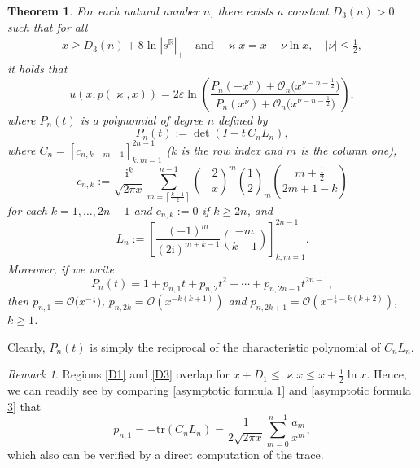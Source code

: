 \documentclass[a4paper,10pt,leqno]{amsart}
\numberwithin{equation}{subsection}
\theoremstyle{plain}
\newtheorem{thm}{Theorem}[section]
\theoremstyle{definition}
\theoremstyle{remark}
\newtheorem*{rem}{Remark}
\theoremstyle{case}
\newcommand{\R}{\mathbb R}
\newcommand{\ii}{\mathrm{i}}
\renewcommand{\O}{\mathcal{O}}
\begin{document}
\begin{tcolorbox}[colback=white,colframe=gray]
\begin{thm}
\label{thm:3}
For each natural number \( n \), there exists a constant \( D_3(n)>0 \) such that for all
\begin{align}
\label{D3}
x\geq D_3(n) + 8\ln |s^\R|_+ \quad \text{and} \quad \varkappa x= x- \nu \ln x, \quad |\nu|\leq \tfrac12, 
\end{align}
it holds that
\begin{equation}
    \label{asymptotic formula 3}
    u(x,p(\varkappa,x)) = 2\varepsilon\ln\left( \frac{P_n(-x^{\nu}) + \O_n\big(x^{\nu-n-\frac12}\big)}{P_n(x^{\nu}) + \O_n\big(x^{\nu-n-\frac12}\big)}\right),
\end{equation}
where \( P_n(t) \) is a polynomial of degree \( n \) defined by
\[
P_n(t) := \det(I - t \, C_nL_n),
\]
where \( C_n=[c_{n,k+m-1}]_{k,m=1}^{2n-1} \) (\( k \) is the row index and \( m \) is the column one), 
\begin{equation}
    \label{definition Cn}
c_{n,k} := \frac{\ii^k}{\sqrt{2\pi x}} \sum_{m = \left\lceil \frac{k-1}{2} \right\rceil}^{n-1} \left( -\frac2x\right)^m \left(\frac12\right)_m \binom{m+\frac12}{2m+1-k}    
\end{equation}
for each \( k=1,\ldots,2n-1\) and \( c_{n,k}:=0\) if \( k\geq 2n\), and
\begin{equation}
    \label{definition Ln}
    L_n := \left[ \frac{(-1)^m}{(2\ii)^{m+k-1}}\binom{-m}{k-1} \right]_{k,m=1}^{2n-1}.
\end{equation}
Moreover, if we write
\[
P_n(t) = 1 + p_{n,1}t + p_{n,2}t^2 + \cdots + p_{n,2n-1}t^{2n-1},
\]
then \( p_{n,1} = \O\big(x^{-\frac12}\big)\), \( p_{n,2k} = \O(x^{-k(k+1)}) \) and \( p_{n,2k+1} = \O(x^{-\frac12-k(k+2)}) \), \( k\geq 1 \).
\end{thm}
\end{tcolorbox}

Clearly,  \( P_n(t) \) is simply the reciprocal of the characteristic polynomial of \( C_nL_n \).

\begin{tcolorbox}[colback=white,colframe=gray]
\begin{rem}
Regions \eqref{D1} and \eqref{D3} overlap for \( x+D_1 \leq \varkappa x\leq x+\tfrac12\ln x\). 
Hence, we can readily see by comparing \eqref{asymptotic formula 1} and \eqref{asymptotic formula 3} that
\[
p_{n,1} = -\mathrm{tr}(C_nL_n) = \frac1{2\sqrt{2\pi x}} \sum_{m=0}^{n-1}\frac{a_m}{x^m},
\]
which also can be verified by a direct computation of the trace. 
\end{rem}
\end{tcolorbox}
\end{document}
